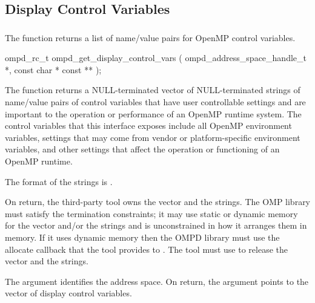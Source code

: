 \subsection{Display Control Variables}



\subsubsection{}
\label{subsubsubsec:ompd_get_display_control_vars}

\summary
The  function returns a list of 
name/value pairs for OpenMP control variables.

\format
\begin{cspecific}
\begin{ompSyntax}
ompd_rc_t ompd_get_display_control_vars (
  ompd_address_space_handle_t *,
  const char * const **
);
\end{ompSyntax}
\end{cspecific}

\descr
The  function returns a NULL-terminated 
vector of NULL-terminated strings of name/value pairs of control variables 
that have user controllable settings and are important to the operation or 
performance of an OpenMP runtime system. The control variables that this 
interface exposes include all OpenMP environment variables, settings that 
may come from vendor or platform-specific environment variables, and other 
settings that affect the operation or functioning of an OpenMP runtime.

The format of the strings is .

On return, the third-party tool owns the vector and the strings. The OMP library
must satisfy the termination constraints; it may use static or dynamic memory 
for the vector and/or the strings and is unconstrained in how it arranges them 
in memory. If it uses dynamic memory then the OMPD library must use the allocate 
callback that the tool provides to . The tool must use 
 to release the vector and the strings.

\argdesc
The  argument identifies the address space. On return, 
the   argument points to the vector of display control variables.

